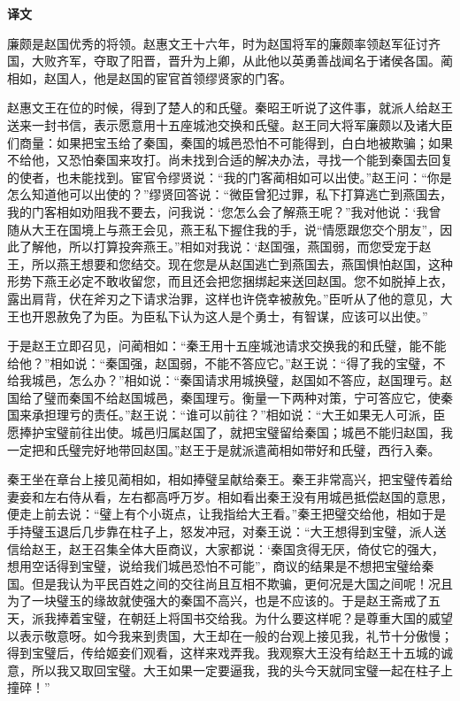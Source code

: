 \documentclass[12pt,UTF-8,openany,a4]{ctexbook}
\begin{document}
\newpage

\begin{Large}
    \noindent\textbf{译文}
\end{Large}


\vspace{1em}

\begin{large}
    \yiwen 
    廉颇是赵国优秀的将领。赵惠文王十六年，时为赵国将军的廉颇率领赵军征讨齐国，大败齐军，夺取了阳晋，晋升为上卿，从此他以英勇善战闻名于诸侯各国。蔺相如，赵国人，他是赵国的宦官首领缪贤家的门客。
    
    赵惠文王在位的时候，得到了楚人的和氏璧。秦昭王听说了这件事，就派人给赵王送来一封书信，表示愿意用十五座城池交换和氏璧。赵王同大将军廉颇以及诸大臣们商量：如果把宝玉给了秦国，秦国的城邑恐怕不可能得到，白白地被欺骗；如果不给他，又恐怕秦国来攻打。尚未找到合适的解决办法，寻找一个能到秦国去回复的使者，也未能找到。宦官令缪贤说：“我的门客蔺相如可以出使。”赵王问：“你是怎么知道他可以出使的？”缪贤回答说：“微臣曾犯过罪，私下打算逃亡到燕国去，我的门客相如劝阻我不要去，问我说：‘您怎么会了解燕王呢？”我对他说：‘我曾随从大王在国境上与燕王会见，燕王私下握住我的手，说“情愿跟您交个朋友”，因此了解他，所以打算投奔燕王。”相如对我说：‘赵国强，燕国弱，而您受宠于赵王，所以燕王想要和您结交。现在您是从赵国逃亡到燕国去，燕国惧怕赵国，这种形势下燕王必定不敢收留您，而且还会把您捆绑起来送回赵国。您不如脱掉上衣，露出肩背，伏在斧刃之下请求治罪，这样也许侥幸被赦免。”臣听从了他的意见，大王也开恩赦免了为臣。为臣私下认为这人是个勇士，有智谋，应该可以出使。”
    
    于是赵王立即召见，问蔺相如：“秦王用十五座城池请求交换我的和氏璧，能不能给他？”相如说：“秦国强，赵国弱，不能不答应它。”赵王说：“得了我的宝璧，不给我城邑，怎么办？”相如说：“秦国请求用城换璧，赵国如不答应，赵国理亏。赵国给了璧而秦国不给赵国城邑，秦国理亏。衡量一下两种对策，宁可答应它，使秦国来承担理亏的责任。”赵王说：“谁可以前往？”相如说：“大王如果无人可派，臣愿捧护宝璧前往出使。城邑归属赵国了，就把宝璧留给秦国；城邑不能归赵国，我一定把和氏璧完好地带回赵国。”赵王于是就派遣蔺相如带好和氏璧，西行入秦。
    
    秦王坐在章台上接见蔺相如，相如捧璧呈献给秦王。秦王非常高兴，把宝璧传着给妻妾和左右侍从看，左右都高呼万岁。相如看出秦王没有用城邑抵偿赵国的意思，便走上前去说：“璧上有个小斑点，让我指给大王看。”秦王把璧交给他，相如于是手持璧玉退后几步靠在柱子上，怒发冲冠，对秦王说：“大王想得到宝璧，派人送信给赵王，赵王召集全体大臣商议，大家都说：‘秦国贪得无厌，倚仗它的强大，想用空话得到宝璧，说给我们城邑恐怕不可能”，商议的结果是不想把宝璧给秦国。但是我认为平民百姓之间的交往尚且互相不欺骗，更何况是大国之间呢！况且为了一块璧玉的缘故就使强大的秦国不高兴，也是不应该的。于是赵王斋戒了五天，派我捧着宝璧，在朝廷上将国书交给我。为什么要这样呢？是尊重大国的威望以表示敬意呀。如今我来到贵国，大王却在一般的台观上接见我，礼节十分傲慢；得到宝璧后，传给姬妾们观看，这样来戏弄我。我观察大王没有给赵王十五城的诚意，所以我又取回宝璧。大王如果一定要逼我，我的头今天就同宝璧一起在柱子上撞碎！”
    

\end{large}
\end{document}
